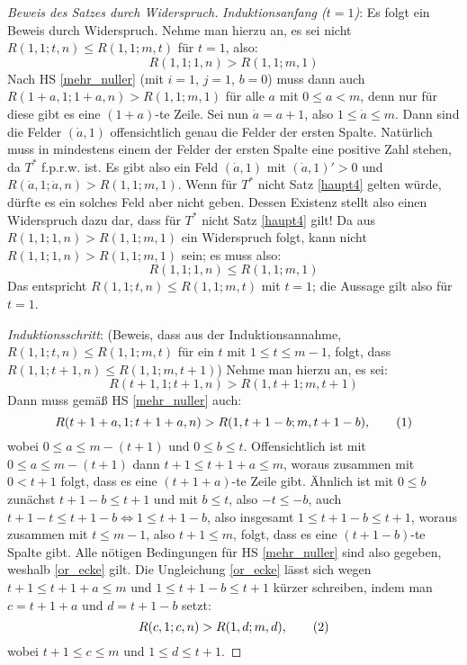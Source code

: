 \begin{proof}[Beweis des Satzes durch Widerspruch]
    \textit{Induktionsanfang ($t=1$)}: Es folgt ein Beweis durch Widerspruch. Nehme man hierzu an, es sei nicht 
    $R(1, 1; t, n)\leq R(1, 1; m, t)$ für $t=1$, also:
    \[
        R(1, 1; 1, n)>R(1, 1; m, 1)
    \]
    Nach HS \ref{mehr_nuller} (mit $i=1$, $j=1$, $b=0$) muss dann auch $R(1+a, 1; 1+a, n) > R(1, 1; m, 1)$ für alle 
    $a$ mit $0\leq a<m$, denn nur für diese gibt es eine $(1+a)$-te Zeile. Sei nun $\dot a=a+1$, also $1\leq \dot 
    a\leq m$. Dann sind die Felder $(\dot a, 1)$ offensichtlich genau die Felder der ersten Spalte. Natürlich muss 
    in mindestens einem der Felder der ersten Spalte eine positive Zahl stehen, da $T^*$ f.p.r.w. ist. Es gibt also 
    ein Feld $(\dot a, 1)$ mit $(\dot a, 1)'>0$ und $R(\dot a, 1; \dot a, n)>R(1, 1; m, 1)$. Wenn für $T^*$ nicht 
    Satz \ref{haupt4} gelten würde, dürfte es ein solches Feld aber nicht geben. Dessen Existenz stellt also einen 
    Widerspruch dazu dar, dass für $T^*$ nicht Satz \ref{haupt4} gilt! Da aus $R(1, 1; 1, n)>R(1, 1; m, 1)$ ein 
    Widerspruch folgt, kann nicht $R(1, 1; 1, n)>R(1, 1; m, 1)$ sein; es muss also:
    \[
        R(1, 1; 1, n)\leq R(1, 1; m, 1)
    \]
    Das entspricht $R(1, 1; t, n)\leq R(1, 1; m, t)$ mit $t=1$; die Aussage gilt also für $t=1$.

    \textit{Induktionsschritt}: (Beweis, dass aus der Induktionsannahme, $R(1, 1; t, n)\leq R(1, 1; m, t)$ für 
    ein $t$ mit $1\leq t\leq m-1$, folgt, dass $R(1, 1; t+1, n)\leq R(1, 1; m, t+1)$) Nehme man hierzu an, es sei:
    \[
        R(t+1, 1; t+1, n)>R(1, t+1; m, t+1)
    \]
    Dann muss gemäß HS \ref{mehr_nuller} auch:
    \[
        R(t+1+a, 1; t+1+a, n)>R(1, t+1-b; m, t+1-b), \numberthis \label{or_ecke}
    \]
    wobei $0\leq a\leq m-(t+1)$ und $0\leq b\leq t$. Offensichtlich ist mit $0\leq a\leq m-(t+1)$ dann $t+1\leq t+1+a
    \leq m$, woraus zusammen mit $0<t+1$ folgt, dass es eine $(t+1+a)$-te Zeile gibt. Ähnlich ist mit $0\leq b$ 
    zunächst $t+1-b\leq t+1$ und mit $b\leq t$, also $-t\leq-b$, auch $t+1-t\leq t+1-b\Leftrightarrow 1\leq t+1-b$, 
    also insgesamt $1\leq t+1-b\leq t+1$, woraus zusammen mit $t\leq m-1$, also $t+1\leq m$, folgt, dass es eine 
    $(t+1-b)$-te Spalte gibt. Alle nötigen Bedingungen für HS \ref{mehr_nuller} sind also gegeben, weshalb 
    \eqref{or_ecke} gilt. Die Ungleichung \eqref{or_ecke} lässt sich wegen $t+1\leq t+1+a\leq m$ und $1\leq t+1-b
    \leq t+1$ kürzer schreiben, indem man $c=t+1+a$ und $d=t+1-b$ setzt:
    \[
        R(c, 1; c, n)>R(1, d; m, d), \numberthis \label{or_eck}
    \]
    wobei $t+1\leq c\leq m$ und $1\leq d\leq t+1$.


\end{proof}
